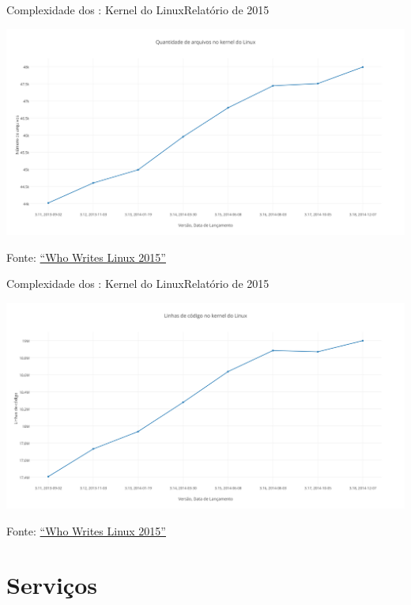 \def\source{{\scriptsize Fonte: \href{http://www.linuxfoundation.org/publications/linux-foundation/who-writes-linux-2015}{``Who Writes Linux 2015''}}}

\begin{frame}{Complexidade dos \so{}: Kernel do Linux}{Relatório de 2015}

  \includegraphics[scale=.35]{linux-files-2015.png}

  \source
\end{frame}

\begin{frame}{Complexidade dos \so{}: Kernel do Linux}{Relatório de 2015}
  
  \includegraphics[scale=.35]{linux-code-2015.png}

  \source
\end{frame}

\def\sectiontitle{Serviços}
\section{\sectiontitle}

